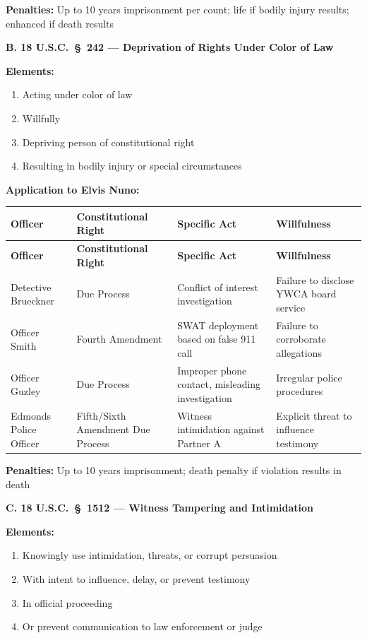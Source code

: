 \documentclass[11pt, letterpaper]{article}
\newcommand{\subsectiontitle}[1]{\vspace{0.15in}\noindent\textcolor{NavyBlue}{\textbf{#1}}\vspace{0.05in}}
\begin{document}
\textbf{Penalties:} Up to 10 years imprisonment per count; life if bodily injury results; enhanced if death results

\subsectiontitle{B. 18 U.S.C.\ \S\ 242 --- Deprivation of Rights Under Color of Law}

\textbf{Elements:}
\begin{enumerate}[leftmargin=*,itemsep=2pt]
    \item Acting under color of law
    \item Willfully
    \item Depriving person of constitutional right
    \item Resulting in bodily injury or special circumstances
\end{enumerate}

\textbf{Application to Elvis Nuno:}

\begin{center}
\begin{longtable}{|p{1.2in}|p{1.3in}|p{1.6in}|p{1.4in}|}
\hline
\textbf{Officer} & \textbf{Constitutional Right} & \textbf{Specific Act} & \textbf{Willfulness} \\
\hline
\endfirsthead
\hline
\textbf{Officer} & \textbf{Constitutional Right} & \textbf{Specific Act} & \textbf{Willfulness} \\
\hline
\endhead
Detective Brueckner & Due Process & Conflict of interest investigation & Failure to disclose YWCA board service \\
\hline
Officer Smith & Fourth Amendment & SWAT deployment based on false 911 call & Failure to corroborate allegations \\
\hline
Officer Guzley & Due Process & Improper phone contact, misleading investigation & Irregular police procedures \\
\hline
Edmonds Police Officer & Fifth/Sixth Amendment Due Process & Witness intimidation against Partner A & Explicit threat to influence testimony \\
\hline
\end{longtable}
\end{center}

\textbf{Penalties:} Up to 10 years imprisonment; death penalty if violation results in death

\subsectiontitle{C. 18 U.S.C.\ \S\ 1512 --- Witness Tampering and Intimidation}

\textbf{Elements:}
\begin{enumerate}[leftmargin=*,itemsep=2pt]
    \item Knowingly use intimidation, threats, or corrupt persuasion
    \item With intent to influence, delay, or prevent testimony
    \item In official proceeding
    \item Or prevent communication to law enforcement or judge
\end{enumerate}
\end{document}
